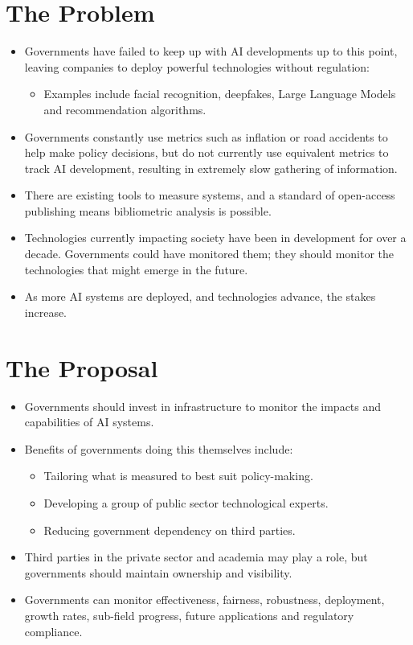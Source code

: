 \documentclass{article}
\begin{document}
\begin{multicols}{2}
\section{The Problem}
\begin{itemize}
\item Governments have failed to keep up with AI developments up to this point, leaving companies to deploy powerful technologies without regulation:
	\begin{itemize}
	\item Examples include facial recognition, deepfakes, Large Language Models and recommendation algorithms.
	\end{itemize}
\item Governments constantly use metrics such as inflation or road accidents to help make policy decisions, but do not currently use equivalent metrics to track AI development, resulting in extremely slow gathering of information.
\item There are existing tools to measure systems, and a standard of open-access publishing means bibliometric analysis is possible.
\item Technologies currently impacting society have been in development for over a decade. Governments could have monitored them; they should monitor the technologies that might emerge in the future.
\item As more AI systems are deployed, and technologies advance, the stakes increase.
\end{itemize}

\section{The Proposal}
\begin{itemize}
\item Governments should invest in infrastructure to monitor the impacts and capabilities of AI systems.
\item Benefits of governments doing this themselves include:
	\begin{itemize}
	\item Tailoring what is measured to best suit policy-making.
	\item Developing a group of public sector technological experts.
	\item Reducing government dependency on third parties.
	\end{itemize}
\item Third parties in the private sector and academia may play a role, but governments should maintain ownership and visibility.
\item Governments can monitor effectiveness, fairness, robustness, deployment, growth rates, sub-field progress, future applications and regulatory compliance.
\end{itemize}


\end{multicols}
\end{document}
